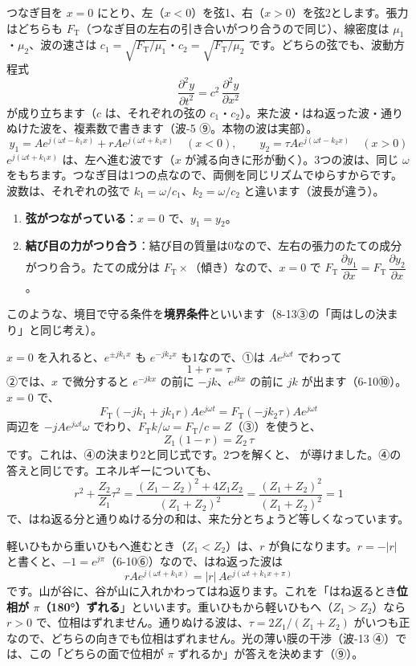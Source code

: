 つなぎ目を $x=0$ にとり、左（$x<0$）を弦1、右（$x>0$）を弦2とします。張力はどちらも $F_{\mathrm T}$（つなぎ目の左右の引き合いがつり合うので同じ）、線密度は $\mu_1$・$\mu_2$、波の速さは $c_1=\sqrt{F_{\mathrm T}/\mu_1}$・$c_2=\sqrt{F_{\mathrm T}/\mu_2}$ です。どちらの弦でも、波動方程式
\[\frac{\partial^2y}{\partial t^2}=c^2\,\frac{\partial^2y}{\partial x^2}\]
が成り立ちます（$c$ は、それぞれの弦の $c_1$・$c_2$）。来た波・はね返った波・通りぬけた波を、複素数で書きます（波-5 ⑨。本物の波は実部）。
\[y_1=Ae^{j(\omega t-k_1x)}+rAe^{j(\omega t+k_1x)}\quad(x<0),\qquad y_2=\tau Ae^{j(\omega t-k_2x)}\quad(x>0)\]
$e^{j(\omega t+k_1x)}$ は、左へ進む波です（$x$ が減る向きに形が動く）。3つの波は、同じ $\omega$ をもちます。つなぎ目は1つの点なので、両側を同じリズムでゆらすからです。波数は、それぞれの弦で $k_1=\omega/c_1$、$k_2=\omega/c_2$ と違います（波長が違う）。

\begin{enumerate}[label={\bkcircled{\arabic*}}, leftmargin=2.4\zw, itemsep=2pt, topsep=2pt]
\item \textbf{弦がつながっている}：$x=0$ で、$y_1=y_2$。
\item \textbf{結び目の力がつり合う}：結び目の質量は0なので、左右の張力のたての成分がつり合う。たての成分は $F_{\mathrm T}\times$（傾き）なので、$x=0$ で $F_{\mathrm T}\,\dfrac{\partial y_1}{\partial x}=F_{\mathrm T}\,\dfrac{\partial y_2}{\partial x}$。
\end{enumerate}
このような、境目で守る条件を\textbf{境界条件}といいます（8-13③の「両はしの決まり」と同じ考え）。

$x=0$ を入れると、$e^{\pm jk_1x}$ も $e^{-jk_2x}$ も1なので、①は $Ae^{j\omega t}$ でわって
\[1+r=\tau\]
②では、$x$ で微分すると $e^{-jkx}$ の前に $-jk$、$e^{jkx}$ の前に $jk$ が出ます（6-10⑩）。$x=0$ で、
\[F_{\mathrm T}(-jk_1+jk_1r)Ae^{j\omega t}=F_{\mathrm T}(-jk_2\tau)Ae^{j\omega t}\]
両辺を $-jAe^{j\omega t}\omega$ でわり、$F_{\mathrm T}k/\omega=F_{\mathrm T}/c=Z$（③）を使うと、
\[Z_1(1-r)=Z_2\,\tau\]
です。これは、④の決まり2と同じ式です。2つを解くと、
が導けました。④の答えと同じです。エネルギーについても、
\[r^2+\frac{Z_2}{Z_1}\tau^2=\frac{(Z_1-Z_2)^2+4Z_1Z_2}{(Z_1+Z_2)^2}=\frac{(Z_1+Z_2)^2}{(Z_1+Z_2)^2}=1\]
で、はね返る分と通りぬける分の和は、来た分とちょうど等しくなっています。

\label{ph:波-7:isou}軽いひもから重いひもへ進むとき（$Z_1<Z_2$）は、$r$ が負になります。$r=-|r|$ と書くと、$-1=e^{j\pi}$（6-10⑥）なので、はね返った波は
\[rAe^{j(\omega t+k_1x)}=|r|\,Ae^{j(\omega t+k_1x+\pi)}\]
です。山が谷に、谷が山に入れかわってはね返ります。これを「はね返るとき\textbf{位相が $\pi$（180°）ずれる}」といいます。重いひもから軽いひもへ（$Z_1>Z_2$）なら $r>0$ で、位相はずれません。通りぬける波は、$\tau=2Z_1/(Z_1+Z_2)$ がいつも正なので、どちらの向きでも位相はずれません。光の薄い膜の干渉（波-13 ④）では、この「どちらの面で位相が $\pi$ ずれるか」が答えを決めます（⑨）。

